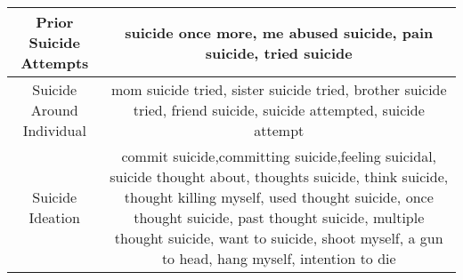 \documentclass[11pt]{article}
\begin{document}
\begin{table*}
\begin{tabulary}{500pt}{|C|C|}
  Prior Suicide Attempts                & suicide once more, me abused suicide, pain suicide, tried suicide                                                                                                                                                                                                                                                                                                                                                                                                                                                                                                                                                                                                                                                                                                                                                                         \\ \hline
  Suicide Around Individual             & mom suicide tried, sister suicide tried, brother suicide tried, friend suicide, suicide attempted, suicide attempt                                                                                                                                                                                                                                                                                                                                                                                                                                                                                                                                                                                                                                                                                                                        \\ \hline
   Suicide Ideation                      & commit suicide,committing suicide,feeling suicidal, suicide thought about, thoughts suicide, think suicide, thought killing myself, used thought suicide, once thought suicide, past thought suicide, multiple thought suicide, want to suicide, shoot myself, a gun to head, hang myself, intention to die                                                                                                                                                                                                                                                                                                                                                                                                                                                                                                                               \\ \hline

\end{tabulary}
\end{table*}
\end{document}
